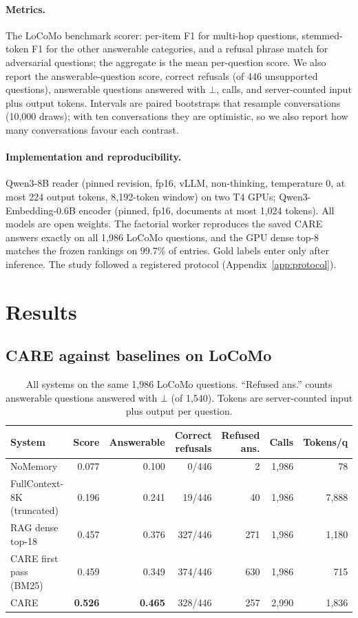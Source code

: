 \documentclass[10pt]{article}
\theoremstyle{plain}
\newcommand{\care}{\textsc{CARE}}
\begin{document}
\paragraph{Metrics.} The LoCoMo benchmark scorer: per-item F1 for multi-hop questions, stemmed-token F1 for the other
answerable categories, and a refusal phrase match for adversarial questions; the aggregate is the mean per-question
score. We also report the answerable-question score, correct refusals (of 446 unsupported questions), answerable
questions answered with $\bot$, calls, and server-counted input plus output tokens. Intervals are paired bootstraps that
resample conversations (10,000 draws); with ten conversations they are optimistic, so we also report how many
conversations favour each contrast.

\paragraph{Implementation and reproducibility.} Qwen3-8B reader (pinned revision, fp16, vLLM, non-thinking, temperature
0, at most 224 output tokens, 8,192-token window) on two T4 GPUs; Qwen3-Embedding-0.6B encoder (pinned, fp16, documents
at most 1,024 tokens). All models are open weights. The factorial worker reproduces the saved \care{} answers exactly on
all 1,986 LoCoMo questions, and the GPU dense top-8 matches the frozen rankings on 99.7\% of entries. Gold labels enter
only after inference. The study followed a registered protocol (Appendix~\ref{app:protocol}).

\section{Results}
\label{sec:results}

\subsection{\care{} against baselines on LoCoMo}

\begin{table}[t]
\centering
\caption{All systems on the same 1,986 LoCoMo questions. ``Refused ans.'' counts answerable questions answered with
$\bot$ (of 1,540). Tokens are server-counted input plus output per question.}
\label{tab:main}
\small
\begin{tabular}{lrrrrrr}
\toprule
System & Score & Answerable & Correct refusals & Refused ans. & Calls & Tokens/q \\
\midrule
NoMemory & 0.077 & 0.100 & 0/446 & 2 & 1,986 & 78 \\
FullContext-8K (truncated) & 0.196 & 0.241 & 19/446 & 40 & 1,986 & 7,888 \\
RAG dense top-18 & 0.457 & 0.376 & 327/446 & 271 & 1,986 & 1,180 \\
\midrule
\care{} first pass (BM25) & 0.459 & 0.349 & 374/446 & 630 & 1,986 & 715 \\
\care{} & \textbf{0.526} & \textbf{0.465} & 328/446 & 257 & 2,990 & 1,836 \\
\bottomrule
\end{tabular}
\end{table}
\end{document}
